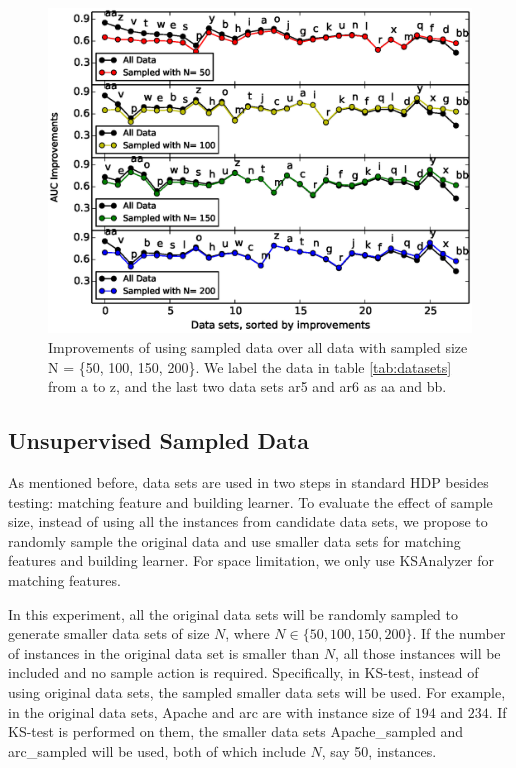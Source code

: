 \begin{figure}[!htp]
	\centering
	\includegraphics[width=\linewidth]{Figures/raleigh/sample_random.eps}
	\caption{Improvements of using sampled data over all data with sampled size N = \{50, 100, 150, 200\}. We label the data in table \ref{tab:datasets} from a to z, and the last two data sets ar5 and ar6 as aa and bb.}
	\label{fig:small_data}
\end{figure}

\subsection{Unsupervised Sampled Data}
\label{sec:small}

As mentioned before, data sets are used in two steps in standard HDP besides testing: matching feature and building learner. To evaluate the effect of sample size, instead of using all the instances from candidate data sets, we propose to randomly sample the original data and use smaller data sets for matching features and building learner. For space limitation, we only use KSAnalyzer for matching features.

In this experiment, all the original data sets will be randomly sampled to generate smaller data sets of size $N$, where $N \in \{50, 100, 150, 200\}$. If the number of instances in the original data set is smaller than $N$, all those instances will be included and no sample action is required. Specifically, in KS-test, instead of using original data sets, the sampled smaller data sets will be used. For example, in the original data sets, Apache and arc are with instance size of $194$ and $234$. If KS-test is performed on them, the smaller data sets Apache\_sampled and arc\_sampled will be used, both of which include $N$, say 50, instances. 

